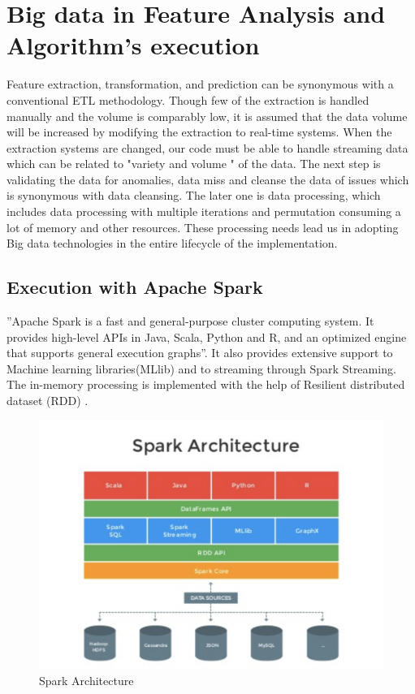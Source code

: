 \documentclass[sigconf]{acmart}
\begin{document}
\section{Big data in Feature Analysis and Algorithm's execution}
Feature extraction, transformation, and prediction can be synonymous with a conventional ETL methodology. Though few of the extraction is handled manually and the volume is comparably low, it is assumed that the data volume will be increased by modifying the extraction to real-time systems. When the extraction systems are changed, our code must be able to handle streaming data which can be related to "variety and volume " of the data. The next step is validating the data for anomalies, data miss and cleanse the data of issues which is synonymous with data cleansing. The later one is data processing, which includes data processing with multiple iterations and permutation consuming a lot of memory and other resources. These processing needs lead us in adopting Big data technologies in the entire lifecycle of the implementation.

\subsection{Execution with Apache Spark}
''Apache Spark is a fast and general-purpose cluster computing system. It provides high-level APIs in Java, Scala, Python and R, and an optimized engine that supports general execution graphs''. It also provides extensive support to Machine learning libraries(MLlib) and to streaming through Spark Streaming. The in-memory processing is implemented with the help of Resilient distributed dataset (RDD) \cite{5:online}.

\begin{figure}[!ht]
  \centering\includegraphics[width=\columnwidth]{images/Sparkarchic.png}
  \caption{Spark Architecture}
\end{figure}
\end{document}
